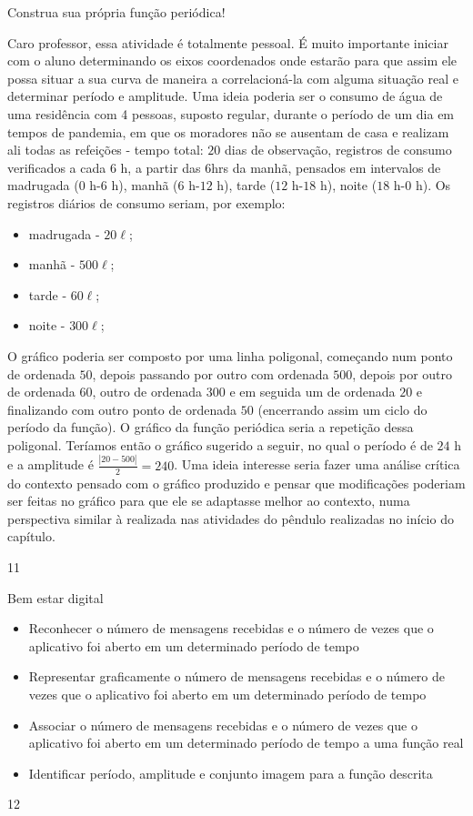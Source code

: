 \begin{sugestions}{Construa sua própria função periódica!}
{
	Caro professor, essa atividade é totalmente pessoal. É muito importante iniciar com o aluno determinando os eixos coordenados onde estarão para que assim ele possa situar a sua curva de maneira a correlacioná-la com alguma situação real e determinar período e amplitude. Uma ideia poderia ser o consumo de água de uma residência com 4 pessoas, suposto regular, durante o período de um dia em tempos de pandemia, em que os moradores não se ausentam de casa e realizam ali todas as refeições - tempo total: $20$ dias de observação, registros de consumo verificados a cada $6$ h, a partir das 6hrs da manhã, pensados em intervalos de madrugada ($0$ h-$6$ h), manhã ($6$ h-$12$ h), tarde ($12$ h-$18$ h), noite ($18$ h-$0$ h). Os registros diários de consumo seriam, por exemplo:
	\begin{itemize}[topsep=2pt]
	 \item madrugada - $20\ell$; 
	 \item manhã - $500\ell$; 
	 \item tarde - $60\ell$; 
	 \item noite - $300\ell$;
	 \end{itemize}
	 O gráfico poderia ser composto por uma linha poligonal, começando num ponto de ordenada $50$, depois passando por outro com ordenada $500$, depois por outro de ordenada $60$, outro de ordenada $300$ e em seguida um de ordenada $20$ e finalizando com outro ponto de ordenada $50$ (encerrando assim um ciclo do período da função). O gráfico da função periódica seria a repetição dessa poligonal. Teríamos então o gráfico sugerido a seguir, no qual o período é de $24$ h e a amplitude é $\frac{|20 - 500|}{2}=240$. Uma ideia interesse seria fazer uma análise crítica do contexto pensado com o gráfico produzido e pensar que modificações poderiam ser feitas no gráfico para que ele se adaptasse melhor ao contexto, numa perspectiva similar à realizada nas atividades do pêndulo realizadas no início do capítulo.
}{1}{1}
\end{sugestions}
\clearmargin
\begin{objectives}{Bem estar digital}
{
\begin{itemize}
\item Reconhecer o número de mensagens recebidas e o número de vezes que o aplicativo foi aberto em um determinado período de tempo 
\item Representar graficamente o número de mensagens recebidas e o número de vezes que o aplicativo foi aberto em um determinado período de tempo
\item Associar o número de mensagens recebidas e o número de vezes que o aplicativo foi aberto em um determinado período de tempo a uma função real
\item Identificar período, amplitude e conjunto imagem para a função descrita
\end{itemize}
}{1}{2}
\end{objectives}
